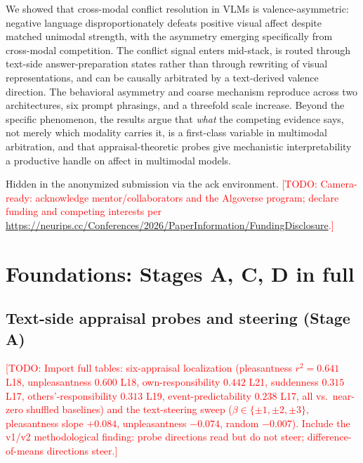 \documentclass{article}
\newcommand{\todo}[1]{\textcolor{red}{[TODO: #1]}}
\begin{document}
We showed that cross-modal conflict resolution in VLMs is valence-asymmetric: negative language disproportionately defeats positive visual affect despite matched unimodal strength, with the asymmetry emerging specifically from cross-modal competition. The conflict signal enters mid-stack, is routed through text-side answer-preparation states rather than through rewriting of visual representations, and can be causally arbitrated by a text-derived valence direction. The behavioral asymmetry and coarse mechanism reproduce across two architectures, six prompt phrasings, and a threefold scale increase. Beyond the specific phenomenon, the results argue that \emph{what} the competing evidence says, not merely which modality carries it, is a first-class variable in multimodal arbitration, and that appraisal-theoretic probes give mechanistic interpretability a productive handle on affect in multimodal models.

\begin{ack}
Hidden in the anonymized submission via the ack environment. \todo{Camera-ready: acknowledge mentor/collaborators and the Algoverse program; declare funding and competing interests per \url{https://neurips.cc/Conferences/2026/PaperInformation/FundingDisclosure}.}
\end{ack}




\appendix

\section{Foundations: Stages A, C, D in full}
\label{app:foundations}

\subsection{Text-side appraisal probes and steering (Stage A)}
\todo{Import full tables: six-appraisal localization (pleasantness $r^2{=}0.641$ L18, unpleasantness $0.600$ L18, own-responsibility $0.442$ L21, suddenness $0.315$ L17, others'-responsibility $0.313$ L19, event-predictability $0.238$ L17, all vs.\ near-zero shuffled baselines) and the text-steering sweep ($\beta \in \{\pm1,\pm2,\pm3\}$, pleasantness slope $+0.084$, unpleasantness $-0.074$, random $-0.007$). Include the v1/v2 methodological finding: probe directions read but do not steer; difference-of-means directions steer.}
\end{document}
